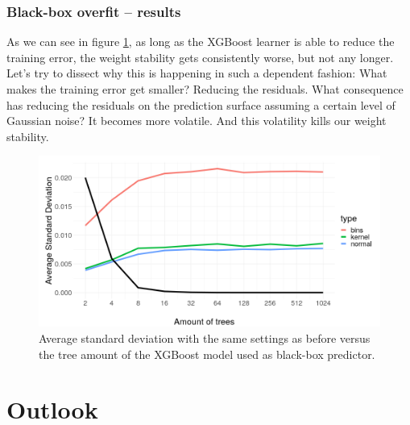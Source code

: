 \documentclass[]{krantz}
\begin{document}
\subsubsection{Black-box overfit --
results}\label{black-box-overfit-results}

As we can see in figure \ref{fig:figoverfit}, as long as the XGBoost
learner is able to reduce the training error, the weight stability gets
consistently worse, but not any longer. Let's try to dissect why this is
happening in such a dependent fashion: What makes the training error get
smaller? Reducing the residuals. What consequence has reducing the
residuals on the prediction surface assuming a certain level of Gaussian
noise? It becomes more volatile. And this volatility kills our weight
stability.

\begin{figure}

{\centering \includegraphics[width=0.99\linewidth]{images/sd_overfitting_presi2} 

}

\caption{Average standard deviation with the same settings as before versus the tree amount of the XGBoost model used as black-box predictor.}\label{fig:figoverfit}
\end{figure}

\section{Outlook}\label{outlook-2}
\end{document}
